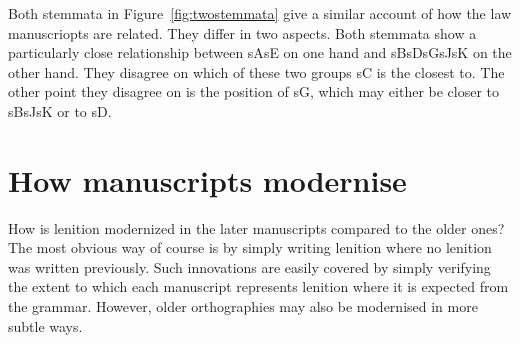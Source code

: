 Both stemmata in Figure~\ref{fig:twostemmata} give a similar account of how the law manuscriopts are related. They differ in two aspects. Both stemmata show a particularly close relationship between \gls{sA}\gls{sE} on one hand and \gls{sB}\gls{sD}\gls{sG}\gls{sJ}\gls{sK} on the other hand. They disagree on which of these two groups \gls{sC} is the closest to. The other point they disagree on is the position of \gls{sG}, which may either be closer to \gls{sB}\gls{sJ}\gls{sK} or to \gls{sD}.
  


\section{How manuscripts modernise}
\label{sec:how-do-manuscripts}

How is lenition modernized in the later manuscripts compared to the older ones?
The most obvious way of course is by simply writing lenition where no lenition was written previously. Such innovations are easily covered by simply verifying the extent to which each manuscript represents lenition where it is expected from the grammar. However, older orthographies may also be modernised in more subtle ways.

